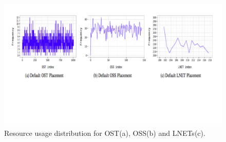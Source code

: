 \begin{figure}[tbh]
  \centering
  \includegraphics[width=\columnwidth]{graphics/infrastructure.pdf}\vspace{-1.2in}
  \caption{Resource usage distribution for OST(a), OSS(b) and LNETs(c). }
\end{figure}






